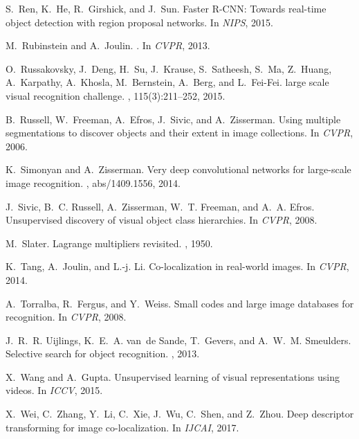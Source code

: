 \documentclass[10pt,twocolumn,letterpaper]{article}
\numberwithin{theorem}{section}
\begin{document}
\begin{thebibliography}{10}
S.~Ren, K.~He, R.~Girshick, and J.~Sun.
\newblock Faster {R-CNN}: Towards real-time object detection with region
  proposal networks.
\newblock In {\em NIPS}, 2015.

M.~Rubinstein and A.~Joulin.
.
\newblock In {\em CVPR}, 2013.

O.~Russakovsky, J.~Deng, H.~Su, J.~Krause, S.~Satheesh, S.~Ma, Z.~Huang,
  A.~Karpathy, A.~Khosla, M.~Bernstein, A.~Berg, and L.~Fei-Fei.
 large scale visual recognition challenge.
, 115(3):211--252, 2015.

B.~Russell, W.~Freeman, A.~Efros, J.~Sivic, and A.~Zisserman.
\newblock Using multiple segmentations to discover objects and their extent in
  image collections.
\newblock In {\em CVPR}, 2006.

K.~Simonyan and A.~Zisserman.
\newblock Very deep convolutional networks for large-scale image recognition.
, abs/1409.1556, 2014.

J.~Sivic, B.~C. Russell, A.~Zisserman, W.~T. Freeman, and A.~A. Efros.
\newblock Unsupervised discovery of visual object class hierarchies.
\newblock In {\em CVPR}, 2008.

M.~Slater.
\newblock Lagrange multipliers revisited.
, 1950.

K.~Tang, A.~Joulin, and L.-j. Li.
\newblock Co-localization in real-world images.
\newblock In {\em CVPR}, 2014.

A.~Torralba, R.~Fergus, and Y.~Weiss.
\newblock Small codes and large image databases for recognition.
\newblock In {\em CVPR}, 2008.

J.~R.~R. Uijlings, K.~E.~A. van~de Sande, T.~Gevers, and A.~W.~M. Smeulders.
\newblock Selective search for object recognition.
, 2013.

X.~Wang and A.~Gupta.
\newblock Unsupervised learning of visual representations using videos.
\newblock In {\em ICCV}, 2015.

X.~Wei, C.~Zhang, Y.~Li, C.~Xie, J.~Wu, C.~Shen, and Z.~Zhou.
\newblock Deep descriptor transforming for image co-localization.
\newblock In {\em IJCAI}, 2017.

\end{thebibliography}
\end{document}
